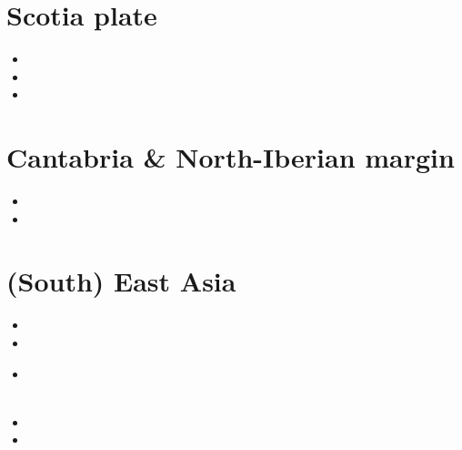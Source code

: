 \section{Scotia plate}

\begin{scriptsize}
\begin{itemize}
\item[\twothousandthirteen]
\item[\twothousandtwenty]
\item[\twothousandtwentyone]
\end{itemize}
\end{scriptsize}

\section{Cantabria \& North-Iberian margin}

\begin{scriptsize}
\begin{itemize}
\item[\twothousandtwo]
\item[\twothousandfifteen]
\end{itemize}
\end{scriptsize}

\section{(South) East Asia}

\begin{scriptsize}
\begin{itemize}
\item[\twothousand]
\item[\twothousandfour]
\item[\twothousandfifteen]
 \\
 \\
\item[\twothousandsixteen]
\item[\twothousandtwentytwo] 
\end{itemize}
\end{scriptsize}

